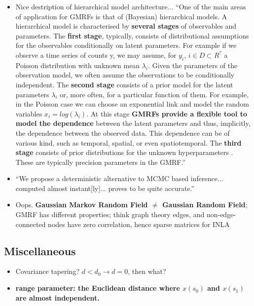 \documentclass{article}
\begin{document}
\begin{itemize}
\item Nice destription of hierarchical model architecture... ``One of the main areas of application for GMRFs is that of (Bayesian) hierarchical models. A hierarchical model is characterised by {\bf several stages} of observables and parameters. The {\bf first stage}, typically, consists of distributional assumptions for the observables conditionally on latent parameters. For example if we observe a time series of counts y, we may assume, for $y_{i}$, $i \in D \subset R^{?}$ a Poisson distribution with unknown mean  $\lambda_{i}$. Given the parameters of the observation model, we often assume the observations to be conditionally independent. The {\bf second stage} consists of a prior model for the latent parameters $\lambda_{i}$ or, more often, for a particular function of them. For example, in the Poisson case we can choose an exponential link and model the random variables $x_{i} = log(\lambda_{i})$. At this stage {\bf GMRFs provide a flexible tool to model the dependence} between the latent parameters and thus, implicitly, the dependence between the observed data. This dependence can be of various kind, such as temporal, spatial, or even spatiotemporal. The {\bf third stage} consists of prior distributions for the unknown hyperparameters  . These are typically precision parameters in the GMRF.''
\item ``We propose a deterministic alternative to MCMC based inference... computed almost instant[ly]... proves to be quite accurate.''
\item Oops. {\bf Gaussian Markov Random Field $\neq$ Gaussian Random Field}; \\
GMRF has different properties; think graph theory edges, and non-edge-connected nodes have zero correlation, hence sparse matrices for INLA
\end{itemize}

\subsection*{Miscellaneous}
\begin{itemize}
\item Covariance tapering? $d < d_{0} \rightarrow d = 0$, then what?
\item {\bf range parameter: the Euclidean distance where $x(s_{0})$ and $x(s_{1})$ are almost independent.} \citep{Lindgren2011}
\end{itemize}
\end{document}
